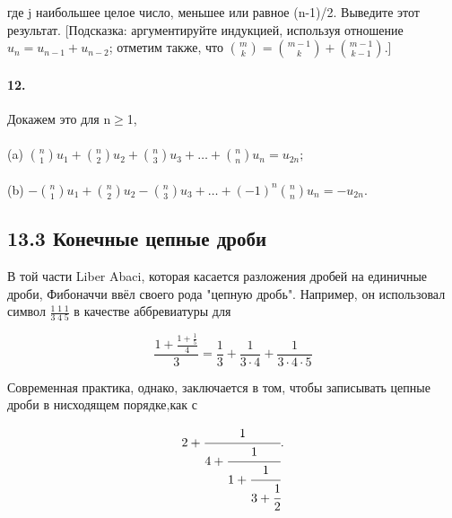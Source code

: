 \documentclass{article}
\begin{document}
	

		\noindent где j наибольшее целое число, меньшее или равное (n-1)/2. Выведите этот результат. [Подсказка: аргументируйте индукцией, используя отношение $u_n = u_{n-1} + u_{n-2}$; отметим также, что ${m\choose k} = {m-1\choose k}+{m-1\choose k-1}$.]\\

\paragraph{12.} Докажем это для n$\geqslant$1,\\
\\
\indent (a) ${n\choose 1}u_1 + {n\choose 2}u_2 + {n\choose 3}u_3 + \ldots + {n\choose n}u_n = u_{2n};$\\
\\
\indent (b) $-{n\choose 1}u_1 + {n\choose 2}u_2 - {n\choose 3}u_3 + \ldots + (-1)^n{n\choose n}u_n = -u_{2n}.$

\subsection*{13.3 Конечные цепные дроби} В той части Liber Abaci, которая касается разложения дробей на единичные дроби, Фибоначчи ввёл своего рода "цепную дробь". Например, он использовал символ $\frac{1\;1\; 1}{3\; 4\; 5}$ в качестве аббревиатуры для

	$$\displaystyle\frac{1+\frac{1+\frac{1}{5}}{4}}{3}=\frac{1}{3} + \frac{1}{3\cdot4} + \frac{1}{3\cdot4\cdot5}$$


\noindent Современная практика, однако, заключается в том, чтобы записывать цепные дроби в нисходящем порядке,как с

$$2+\cfrac{1}{
	4+\cfrac{1}{
		1+\cfrac{1}{
			3+\cfrac{1}{2}}}}.$$
\end{document}
